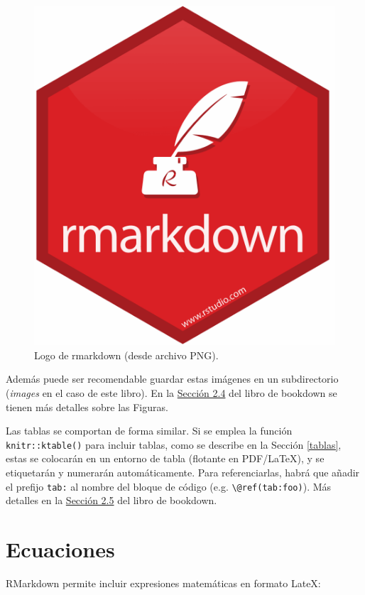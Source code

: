 \documentclass[]{book}
\newenvironment{Shaded}{\begin{snugshade}}{\end{snugshade}}
\newcommand{\NormalTok}[1]{#1}
\theoremstyle{definition}
\theoremstyle{definition}
\theoremstyle{definition}
\theoremstyle{remark}
\begin{document}
\begin{Shaded}
\end{Shaded}

\begin{figure}

{\centering \includegraphics[width=0.3\linewidth]{images/rmarkdown} 

}

\caption{Logo de rmarkdown (desde archivo PNG).}\label{fig:rmarkdown}
\end{figure}

Además puede ser recomendable guardar estas imágenes en un subdirectorio
(\emph{images} en el caso de este libro). En la
\href{https://bookdown.org/yihui/bookdown/figures.html}{Sección 2.4} del
libro de bookdown se tienen más detalles sobre las Figuras.

Las tablas se comportan de forma similar. Si se emplea la función
\texttt{knitr::ktable()} para incluir tablas, como se describe en la
Sección \ref{tablas}, estas se colocarán en un entorno de tabla
(flotante en PDF/LaTeX), y se etiquetarán y numerarán automáticamente.
Para referenciarlas, habrá que añadir el prefijo \texttt{tab:} al nombre
del bloque de código (e.g. \texttt{\textbackslash{}@ref(tab:foo)}). Más
detalles en la
\href{https://bookdown.org/yihui/bookdown/tables.html}{Sección 2.5} del
libro de bookdown.

\section{Ecuaciones}\label{ecuaciones}

RMarkdown permite incluir expresiones matemáticas en formato LateX:
\end{document}
